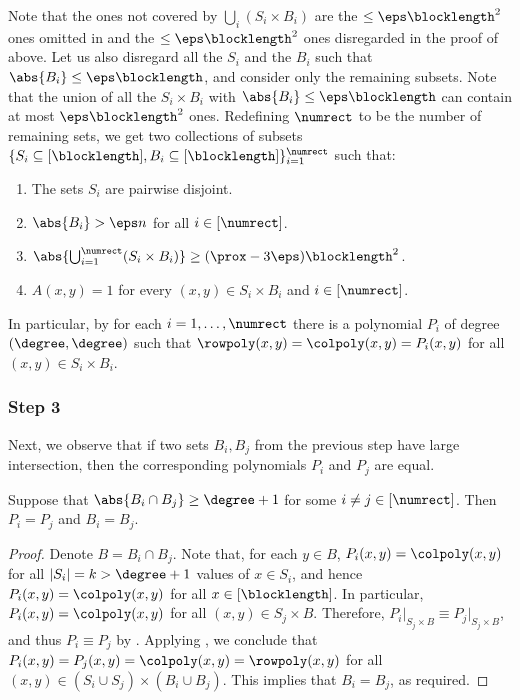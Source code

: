 \documentclass{toc}
\theoremstyle{plain}
\begin{document}
    \medskip\noindent
    Note that the ones not covered by $\bigcup_{i} (S_i \times B_i)$ are the
    $\leq \eps \blocklength^2$ ones omitted in 
    and the $\leq \eps \blocklength^2$ ones disregarded in the proof of  above.
    Let us also disregard all
%
the $S_i$ and the $B_i$     %
such that $\abs{B_i} \leq \eps \blocklength$, and consider only the remaining subsets.
%
%
%
%
Note that the union of all
the   %
$S_i \times B_i$             %
with $\abs{B_i} \leq \eps \blocklength$ can %
contain     %
at most $\eps \blocklength^2$ ones.
    Redefining $\numrect$ to be the number of remaining sets, we get two collections of subsets $\{S_i \subseteq [\blocklength], B_i  \subseteq [\blocklength]\}_{i=1}^{\numrect}$ such that:
    \begin{enumerate}
%
%
        \item The sets $S_i$ are pairwise disjoint.                         %
        \item $\abs{B_i} > \eps n$ for all $i \in [\numrect]$.
        \item $\abs{ \bigcup_{i=1}^{\numrect} (S_i \times B_i)} \geq (\prox - 3\eps)\blocklength^2$.
        \item $A(x,y) = 1$ for every $(x,y) \in {S_i \times B_i}$ and $i \in [\numrect]$.
    \end{enumerate}
    In particular, by  for each $i=1, \dots, \numrect$
    there is a polynomial $P_i$ of degree $(\degree,\degree)$ such that
    $\rowpoly(x,y) = \colpoly(x,y) = P_i(x,y)$ for all $(x,y) \in S_i \times B_i$.

   \subsubsection{Step 3}
    Next, we observe that if two sets $B_i,B_j$ from the previous step have large intersection,
    then the corresponding polynomials $P_i$ and $P_j$ are equal.

    \begin{claim}\label{claim:Pi=Pj}
        Suppose that $\abs{B_i \cap B_j} \geq \degree+1$ for some $i \neq j \in [\numrect]$.
        Then $P_i = P_j$ and $B_i = B_j$.
    \end{claim}
    \begin{proof}
        Denote $B = B_i \cap B_j$.
        Note that, for each $y \in B$,
        $P_i(x,y) = \colpoly(x,y)$ for all $|S_i| = k > \degree+1$ values of $x \in S_i$,
        and hence $P_i(x,y) = \colpoly(x,y)$ for all $x \in [\blocklength]$.
        In particular, $P_i(x,y) = \colpoly(x,y)$ for all $(x,y) \in S_j \times B$.
        Therefore, ${P_i} \vert_{S_j \times B}  \equiv {P_j} \vert_{S_j \times B}$,
        and thus $P_i \equiv P_j$ by .
        Applying , we conclude that $P_i(x,y) = P_j(x,y) = \colpoly(x,y) = \rowpoly(x,y)$
        for all $(x,y) \in (S_i \cup S_j) \times (B_i \cup B_j)$.
        This implies that $B_i = B_j$, as required.
    \end{proof}
\end{document}
